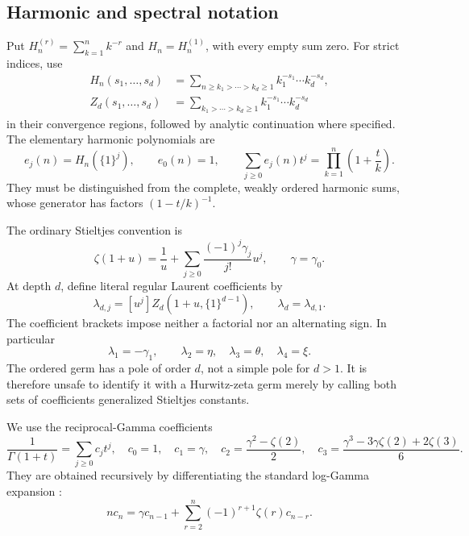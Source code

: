 \subsection{Harmonic and spectral notation}

Put $H_n^{(r)}=\sum_{k=1}^n k^{-r}$ and $H_n=H_n^{(1)}$, with every
empty sum zero. For strict indices, use
\begin{align}
 H_n(s_1,\ldots,s_d)&=
 \sum_{n\ge k_1>\cdots>k_d\ge1}k_1^{-s_1}\cdots k_d^{-s_d},\\
 Z_d(s_1,\ldots,s_d)&=
 \sum_{k_1>\cdots>k_d\ge1}k_1^{-s_1}\cdots k_d^{-s_d}
 \label{eq:strictzeta}
\end{align}
in their convergence regions, followed by analytic continuation where
specified. The elementary harmonic polynomials are
\begin{equation}\label{eq:edef}
 e_j(n)=H_n(\{1\}^j),\qquad e_0(n)=1,
 \qquad \sum_{j\ge0}e_j(n)t^j=\prod_{k=1}^n\left(1+\frac tk\right).
\end{equation}
They must be distinguished from the complete, weakly ordered harmonic
sums, whose generator has factors $(1-t/k)^{-1}$.

The ordinary Stieltjes convention is
\begin{equation}\label{eq:stieltjes}
 \zeta(1+u)=\frac1u+
 \sum_{j\ge0}\frac{(-1)^j\gamma_j}{j!}u^j,
 \qquad \gamma=\gamma_0.
\end{equation}
At depth $d$, define literal regular Laurent coefficients by
\begin{equation}\label{eq:lambdadef}
 \lambda_{d,j}=[u^j]Z_d(1+u,\{1\}^{d-1}),\qquad
 \lambda_d=\lambda_{d,1}.
\end{equation}
The coefficient brackets impose neither a factorial nor an alternating
sign. In particular
\[
 \lambda_1=-\gamma_1,\qquad
 \lambda_2=\eta,\quad\lambda_3=\theta,\quad\lambda_4=\xi.
\]
The ordered germ has a pole of order $d$, not a simple pole for $d>1$.
It is therefore unsafe to identify it with a Hurwitz-zeta germ merely
by calling both sets of coefficients generalized Stieltjes constants.

We use the reciprocal-Gamma coefficients
\begin{equation}\label{eq:cdef}
 \frac1{\Gamma(1+t)}=\sum_{j\ge0}c_jt^j,
 \quad c_0=1,\quad c_1=\gamma,\quad
 c_2=\frac{\gamma^2-\zeta(2)}2,\quad
 c_3=\frac{\gamma^3-3\gamma\zeta(2)+2\zeta(3)}6.
\end{equation}
They are obtained recursively by differentiating the standard
log-Gamma expansion \cite{DLMF}:
\begin{equation}\label{eq:crecurrence}
 n c_n=\gamma c_{n-1}
       +\sum_{r=2}^n(-1)^{r+1}\zeta(r)c_{n-r}.
\end{equation}

